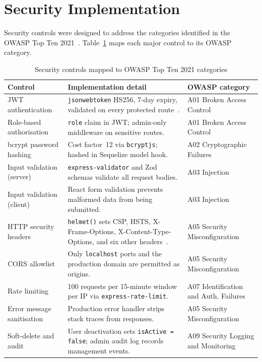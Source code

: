 \section{Security Implementation}

Security controls were designed to address the categories identified in the
OWASP Top Ten 2021~\cite{owasp2021}. Table~\ref{tab:security} maps each
major control to its OWASP category.

\begin{table}[H]
  \centering
  \caption{Security controls mapped to OWASP Top Ten 2021 categories}
  \label{tab:security}
  \begin{tabularx}{\linewidth}{lXl}
    \toprule
    \textbf{Control} & \textbf{Implementation detail} & \textbf{OWASP category} \\
    \midrule
    JWT authentication        & \texttt{jsonwebtoken} HS256, 7-day expiry, validated on every protected route~\cite{jwt2015}. & A01 Broken Access Control \\
    Role-based authorisation  & \texttt{role} claim in JWT; admin-only middleware on sensitive routes. & A01 Broken Access Control \\
    bcrypt password hashing   & Cost factor~12 via \texttt{bcryptjs}; hashed in Sequelize model hook. & A02 Cryptographic Failures \\
    Input validation (server) & \texttt{express-validator} and Zod schemas validate all request bodies. & A03 Injection \\
    Input validation (client) & React form validation prevents malformed data from being submitted. & A03 Injection \\
    HTTP security headers     & \texttt{helmet()} sets CSP, HSTS, X-Frame-Options, X-Content-Type-Options, and six other headers~\cite{helmet2023}. & A05 Security Misconfiguration \\
    CORS allowlist            & Only \texttt{localhost} ports and the production domain are permitted as origins. & A05 Security Misconfiguration \\
    Rate limiting             & 100 requests per 15-minute window per IP via \texttt{express-rate-limit}. & A07 Identification and Auth. Failures \\
    Error message sanitisation & Production error handler strips stack traces from responses. & A05 Security Misconfiguration \\
    Soft-delete and audit     & User deactivation sets \texttt{isActive = false}; admin audit log records management events. & A09 Security Logging and Monitoring \\
    \bottomrule
  \end{tabularx}
\end{table}

